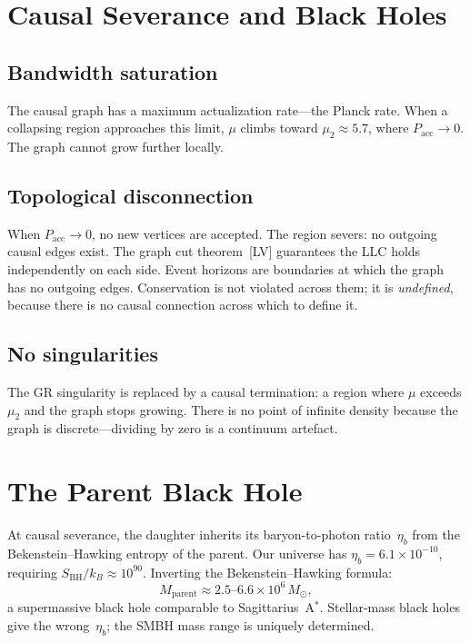 \documentclass[11pt,a4paper]{article}
\theoremstyle{plain}
\theoremstyle{definition}
\theoremstyle{remark}
\begin{document}
\section{Causal Severance and Black Holes}\label{sec:severance}

\subsection{Bandwidth saturation}\label{sec:bandwidth}

The causal graph has a maximum actualization rate---the Planck rate.  When a
collapsing region approaches this limit, $\mu$ climbs toward $\mu_2 \approx 5.7$,
where $P_{\mathrm{acc}} \to 0$.  The graph cannot grow further locally.

\subsection{Topological disconnection}\label{sec:disconnection}

When $P_{\mathrm{acc}} \to 0$, no new vertices are accepted.  The region severs:
no outgoing causal edges exist.  The graph cut theorem~[LV] guarantees the LLC
holds independently on each side.  Event horizons are boundaries at which the graph
has no outgoing edges.  Conservation is not violated across them; it is
\emph{undefined}, because there is no causal connection across which to define it.

\subsection{No singularities}\label{sec:no-sing}

The GR singularity is replaced by a causal termination: a region where $\mu$
exceeds $\mu_2$ and the graph stops growing.  There is no point of infinite density
because the graph is discrete---dividing by zero is a continuum artefact.

\section{The Parent Black Hole}\label{sec:parent}

At causal severance, the daughter inherits its baryon-to-photon ratio~$\eta_b$ from
the Bekenstein--Hawking entropy of the parent.  Our universe has
$\eta_b = 6.1 \times 10^{-10}$, requiring $S_{\mathrm{BH}}/k_B \approx 10^{90}$.
Inverting the Bekenstein--Hawking formula:
\begin{equation}
M_{\mathrm{parent}} \approx 2.5\text{--}6.6 \times 10^6\,M_\odot,
\label{eq:parent}
\end{equation}
a supermassive black hole comparable to Sagittarius~A$^*$.  Stellar-mass black
holes give the wrong~$\eta_b$; the SMBH mass range is uniquely determined.
\end{document}
